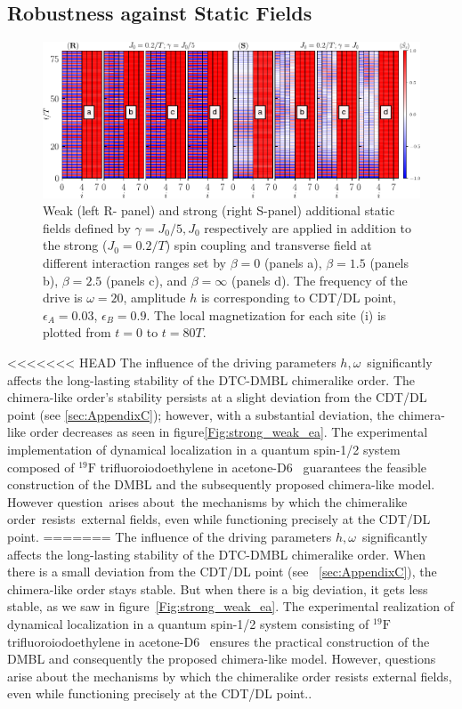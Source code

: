 \documentclass[12pt]{iopart}
\begin{document}
\subsection{\label{sec:level44} Robustness against Static Fields}
\begin{figure}[h!]
	\begin{center}
		\includegraphics[width=13cm]{figure13.pdf}
	\end{center}
	\caption{Weak (left R- panel) and strong (right S-panel) additional static fields defined by $\gamma = J_0/5, J_0$ respectively are applied in addition to the strong ($J_0=0.2/T$) spin coupling and transverse field at different interaction ranges set by $\beta = 0$ (panels a), $\beta= 1.5$ (panels b), $\beta=2.5$ (panels c), and $\beta= \infty$ (panels d). The frequency of the drive is $\omega = 20$, amplitude $h$ is corresponding to CDT/DL point, $\epsilon_A=0.03$, $\epsilon_B=0.9$.  The local magnetization for each site (i) is plotted from $t=0$ to $t=80 T$.}
	\label{Fig:robustness}
\end{figure}
<<<<<<< HEAD
The influence of the driving parameters $h, \omega$ significantly affects the long-lasting stability of the DTC-DMBL chimeralike order. The chimera-like order's stability persists at a slight deviation from the CDT/DL point (see \ref{sec:AppendixC}); however, with a substantial deviation, the chimera-like order decreases as seen in figure\ref{Fig:strong_weak_ea}. The experimental implementation of dynamical localization in a quantum spin-1/2 system composed of $^{19}\mathrm{F}$ trifluoroiodoethylene in acetone-D6~\cite{Hegde2014} guarantees the feasible construction of the DMBL and the subsequently proposed chimera-like model. However question arises about the mechanisms by which the chimeralike order resists external fields, even while functioning precisely at the CDT/DL point.
=======
The influence of the driving parameters $h, \omega$ significantly affects the long-lasting stability of the DTC-DMBL chimeralike order. When there is a small deviation from the CDT/DL point (see ~\ref{sec:AppendixC}), the chimera-like order stays stable. But when there is a big deviation, it gets less stable, as we saw in figure~\ref{Fig:strong_weak_ea}. The experimental realization of dynamical localization in a quantum spin-1/2 system consisting of $^{19}\mathrm{F}$ trifluoroiodoethylene in acetone-D6~\cite{Hegde2014} ensures the practical construction of the DMBL and consequently the proposed chimera-like model. However, questions arise about the mechanisms by which the chimeralike order resists external fields, even while functioning precisely at the CDT/DL point..
\end{document}
